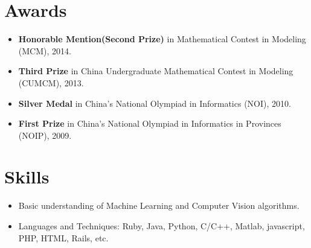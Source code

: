 \documentclass[letterpaper]{article}
\begin{document}
\section*{Awards}
\begin{itemize}
\item  \textbf{Honorable Mention(Second Prize)} in Mathematical Contest in Modeling (MCM), 2014.
\item  \textbf{Third Prize} in China Undergraduate Mathematical Contest in Modeling (CUMCM), 2013. 
\item  \textbf{Silver Medal} in China's National Olympiad in Informatics (NOI), 2010. 
\item  \textbf{First Prize} in China's National Olympiad in Informatics in Provinces (NOIP), 2009. 
\end{itemize}

\section*{Skills}
\begin{itemize}
\item Basic understanding of Machine Learning and Computer Vision algorithms.
\item Languages and Techniques: Ruby, Java, Python, C/C++, Matlab, javascript, PHP, HTML, Rails, etc.
\end{itemize}
\end{document}
